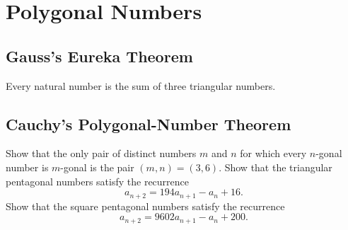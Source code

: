 \chapter{Polygonal Numbers}

\section{Gauss's Eureka Theorem}

\begin{theorem}
  Every natural number is the sum of three triangular numbers.
\end{theorem}

\section{Cauchy's Polygonal-Number Theorem}

\exercises

\begin{routine}
  \exercise Show that the only pair of distinct numbers $m$ and $n$ for which every $n$-gonal number is $m$-gonal is the pair $(m,n)=(3,6)$.
  \exercise Show that the triangular pentagonal numbers satisfy the recurrence
  \begin{equation*}
    a_{n+2}=194 a_{n+1}-a_n+16.
  \end{equation*}
  \exercise Show that the square pentagonal numbers satisfy the recurrence
  \begin{equation*}
    a_{n+2}=9602 a_{n+1}-a_n+200.
  \end{equation*}
\end{routine}

